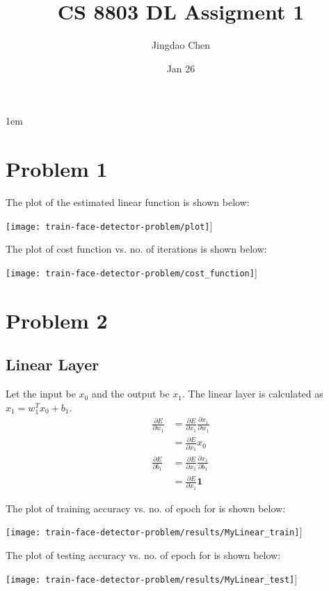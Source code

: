 \documentclass[twoside,12pt]{article}
\newcommand{\imsize}{0.5\linewidth}
\begin{document}
\title{CS 8803 DL Assigment 1}
\author{Jingdao Chen}
\date{Jan 26}
\maketitle
\openup 1em

\section{Problem 1}

The plot of the estimated linear function is shown below:

\texttt{[image: train-face-detector-problem/plot]}]

The plot of cost function vs. no. of iterations is shown below:

\texttt{[image: train-face-detector-problem/cost\_function]}]

\section{Problem 2}

\subsection{Linear Layer}

Let the input be $x_0$ and the output be $x_1$. The linear layer is calculated as $x_1=w_1^Tx_0+b_1$.
\begin{equation}
\begin{split}
\frac{\partial E}{\partial w_1} &= \frac{\partial E}{\partial x_1} \frac{\partial x_1}{\partial w_1} \\
							    &= \frac{\partial E}{\partial x_1} x_0 \\
\frac{\partial E}{\partial b_1} &= \frac{\partial E}{\partial x_1} \frac{\partial x_1}{\partial b_1} \\
							    &= \frac{\partial E}{\partial x_1} \mathbf{1} 
\end{split}
\end{equation}

The plot of training accuracy vs. no. of epoch for is shown below:

\texttt{[image: train-face-detector-problem/results/MyLinear\_train]}]

The plot of testing accuracy vs. no. of epoch for is shown below:

\texttt{[image: train-face-detector-problem/results/MyLinear\_test]}]
\end{document}
